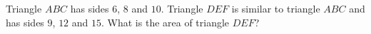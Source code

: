Triangle $ABC$ has sides $6$, $8$ and $10$. Triangle $DEF$ is similar to triangle $ABC$ and has sides $9$, $12$ and $15$. What is the area of triangle $DEF$?
